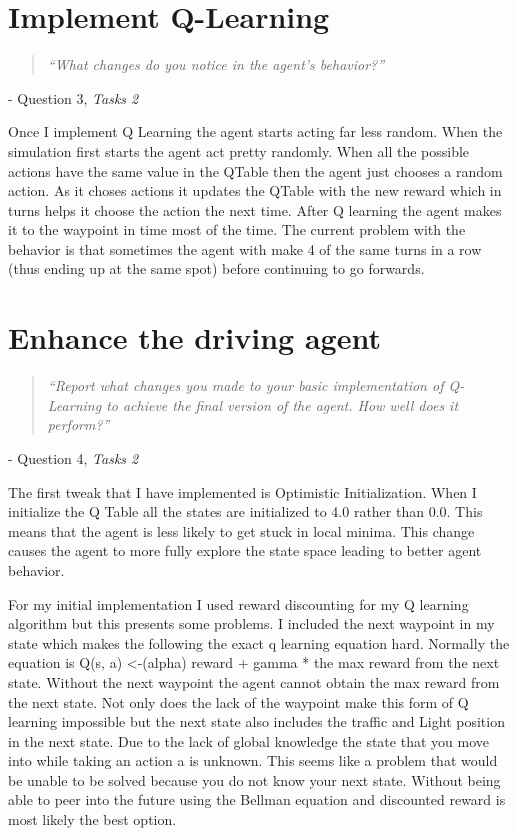 \documentclass{article}
\newcommand{\chapquote}[3]
  {\begin{quotation} 
   \textit{#1} 
   \end{quotation} 
   \begin{flushright} - #2, 
   \textit{#3}
   \end{flushright} 
  }
\begin{document}
\section*{Implement Q-Learning}
\chapquote{``What changes do you notice in the agent’s behavior?''}{Question 3}{Tasks 2}

Once I implement Q Learning the agent starts acting far less random. When the simulation first starts the agent act pretty randomly. When all the possible actions have the same value in the QTable then the agent just chooses a random action. As it choses actions it updates the QTable with the new reward which in turns helps it choose the action the next time. After Q learning the agent makes it to the waypoint in time most of the time. The current problem with the behavior is that sometimes the agent with make 4 of the same turns in a row (thus ending up at the same spot) before continuing to go forwards.

\section*{Enhance the driving agent}
\chapquote{``Report what changes you made to your basic implementation of Q-Learning to achieve the final version of the agent. How well does it perform?''}{Question 4}{Tasks 2}

The first tweak that I have implemented is Optimistic Initialization. When I initialize the Q Table all the states are initialized to 4.0 rather than 0.0. This means that the agent is less likely to get stuck in local minima. This change causes the agent to more fully explore the state space leading to better agent behavior.

For my initial implementation I used reward discounting for my Q learning algorithm but this presents some problems. I included the next waypoint in my state which makes the following the exact q learning equation hard. Normally the equation is Q(s, a) <-(alpha) reward + gamma * the max reward from the next state. Without the next waypoint the agent cannot obtain the max reward from the next state. Not only does the lack of the waypoint make this form of Q learning impossible but the next state also includes the traffic and Light position in the next state. Due to the lack of global knowledge the state that you move into while taking an action a is unknown. This seems like a problem that would be unable to be solved because you do not know your next state. Without being able to peer into the future using the Bellman equation and discounted reward is most likely the best option.
\end{document}
